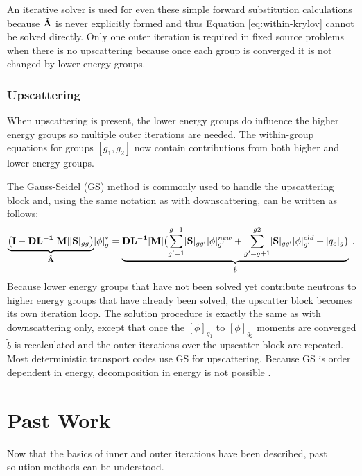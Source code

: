 An iterative solver is used for even these simple forward substitution calculations because $\tilde{\mathbf{A}}$ is never explicitly formed and thus Equation \eqref{eq:within-krylov} cannot be solved directly. Only one outer iteration is required in fixed source problems when there is no upscattering because once each group is converged it is not changed by lower energy groups. 


\subsubsection{Upscattering}
When upscattering is present, the lower energy groups do influence the higher energy groups so multiple outer iterations are needed. The within-group equations for groups $[g_{1}, g_{2}]$ now contain contributions from both higher and lower energy groups. 

The Gauss-Seidel (GS) method is commonly used to handle the upscattering block and, using the same notation as with downscattering, can be written as follows:
%
\begin{equation}
\underbrace{\bigl( \mathbf{I} - \mathbf{DL^{-1}}[\mathbf{M}][\mathbf{S}]_{gg} \bigr)}_{\tilde{\mathbf{A}}} [\phi]^{*}_{g} = \underbrace{\mathbf{DL^{-1}}[\mathbf{M}] \bigl( \sum_{g'=1}^{g-1}[\mathbf{S}]_{gg'}[\phi]^{new}_{g'} + \sum_{g'=g+1}^{g2} [\mathbf{S}]_{gg'}[\phi]^{old}_{g'}  + [q_{e}]_{g} \bigr)}_{\tilde{b}}  \:.
 \label{eq:up-GS}
\end{equation}
%
Because lower energy groups that have not been solved yet contribute neutrons to higher energy groups that have already been solved, the upscatter block becomes its own iteration loop. The solution procedure is exactly the same as with downscattering only, except that once the $[\phi]_{g_{1}}$ to $[\phi]_{g_{2}}$ moments are converged $\tilde{b}$ is recalculated and the outer iterations over the upscatter block are repeated. Most deterministic transport codes use GS for upscattering. Because GS is order dependent in energy, decomposition in energy is not possible \cite{Evans2009d}. 

\section{Past Work}
Now that the basics of inner and outer iterations have been described, past solution methods can be understood. 

